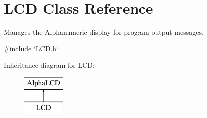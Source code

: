\hypertarget{class_l_c_d}{\section{L\-C\-D Class Reference}
\label{class_l_c_d}
}


Manages the Alphanumeric display for program output messages.  




{\ttfamily \#include \char`\"{}L\-C\-D.\-h\char`\"{}}

Inheritance diagram for L\-C\-D\-:\begin{figure}[H]
\begin{center}
\leavevmode
\includegraphics[height=2.000000cm]{class_l_c_d}
\end{center}
\end{figure}

